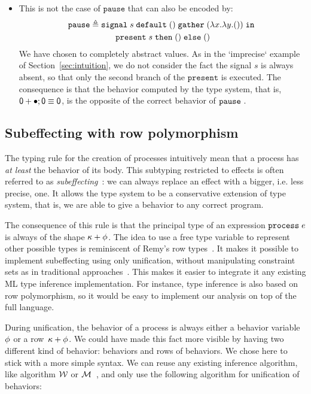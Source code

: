 \documentclass[9pt,preprint]{sigplanconf}
\newcommand{\deq}{\triangleq}
\begin{document}
\begin{itemize}
\item This is not the case of $\mathtt{pause}$ that can also be encoded by:
%
\begin{align*}
\mathtt{pause} \deq &\; \esig{s}{\evoid}{(\elam{x}{\elam{y}{\mathtt{\evoid}}})}
                                    { \\ &\qquad \epres{s}{\evoid}{\evoid}}
\end{align*}
%
We have chosen to completely abstract values. As in the `imprecise` example of Section~\ref{sec:intuition}, we do not consider the fact the signal $s$ is always absent, so that only the second branch of the $\mathtt{present}$ is executed. The consequence is that the behavior computed by the type system, that is, $\textsf{0} + \bullet ; \textsf{0} \equiv \textsf{0}$, is the opposite of the correct behavior of $\mathtt{pause}\;$.

\end{itemize}

\subsection{Subeffecting with row polymorphism}

The typing rule for the creation of processes intuitively mean that a process has \emph{at least} the behavior of its body. This subtyping restricted to effects is often referred to as \emph{subeffecting}~\cite{Nielson:1999}: we can always replace an effect with a bigger, i.e. less precise, one. It allows the type system to be a conservative extension of \rml{} type system, that is, we are able to give a behavior to any correct \rml{} program.

The consequence of this rule is that the principal type of an expression $\mathtt{process}\; e$ is always of the shape $\kappa + \phi$. The idea to use a free type variable to represent other possible types is reminiscent of Remy's row types~\cite{Remy:1993}. It makes it possible to implement subeffecting using only unification, without manipulating constraint sets as in traditional approaches~\cite{Talpin:1992a, Amtoft:1999}. This makes it easier to integrate it any existing ML type inference implementation. For instance, \ocaml{} type inference is also based on row polymorphism, so it would be easy to implement our analysis on top of the full language. 

During unification, the behavior of a process is always either a behavior variable~$\phi$ or a row~$\kappa + \phi$. We could have made this fact more visible by having two different kind of behavior: behaviors and rows of behaviors. We chose here to stick with a more simple syntax. We can reuse any existing inference algorithm, like algorithm $\mathcal{W}$ or $\mathcal{M}$~\cite{Lee:1998a}, and only use the following algorithm for unification of behaviors:
\end{document}

